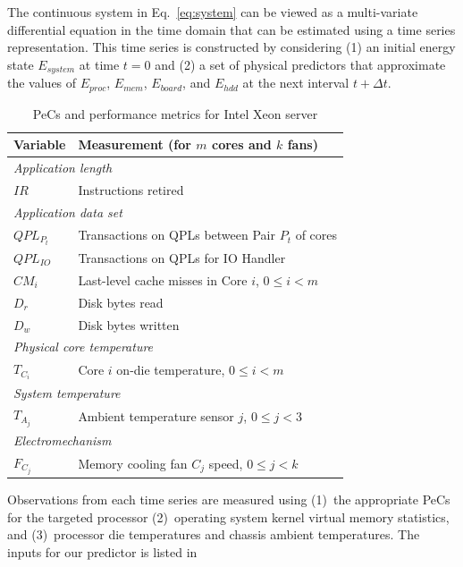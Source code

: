 \documentclass[times, 10pt,twocolumn]{IEEEtran}
\newcommand{\equationnames}{Eq.}
\begin{document}
The continuous system in \equationnames\ \eqref{eq:system} can be viewed
as a multi-variate differential equation in the time domain that can be
estimated using a time series representation. This time series is
constructed by considering (1) an initial energy state $E_{system}$ at
time $t=0$ and (2) a set of physical predictors that approximate the
values of $E_{proc}$, $E_{mem}$, $E_{board}$, and $E_{hdd}$ at the next
interval $t+\Delta t$.

\begin{small}
\begin{table}[!t]
  \centering
  \caption{PeCs and performance metrics for Intel Xeon server}
  \label{tab:intelmodel}
  \begin{tabular}{l l}
\hline
\hline
\textbf{Variable}&\textbf{Measurement} (for $m$ cores and $k$ fans)\\
\hline
\hline
\multicolumn{2}{l}{\textit{Application length}}\\
$IR$&Instructions retired \\
\hline
\multicolumn{2}{l}{\textit{Application data set}}\\
$QPL_{P_t}$&Transactions on QPLs between Pair $P_t$ of cores\\
$QPL_{IO}$&Transactions on QPLs for IO Handler\\
$CM_{i}$&Last-level cache misses in  Core $i$, $0\leq i < m$\\
$D_{r}$&Disk bytes read\\
$D_{w}$&Disk bytes written\\
\hline
\multicolumn{2}{l}{\textit{Physical core temperature}}\\
$T_{C_{i}}$&Core $i$ on-die temperature, $0\leq i < m$\\
\hline
\multicolumn{2}{l}{\textit{System temperature}}\\
$T_{A_{j}}$&Ambient temperature sensor $j$, $0\leq j < 3$\\
\hline
\multicolumn{2}{l}{\textit{Electromechanism}}\\
$F_{C_{j}}$&Memory cooling fan $C_j$ speed, $0\leq j < k$\\
\hline
  \end{tabular}
\end{table}
\end{small}
Observations from each time series are measured using (1)~the
appropriate PeCs for the targeted processor (2)~operating system kernel
virtual memory statistics, and (3)~processor die temperatures and
chassis ambient temperatures.  The inputs for our predictor is listed in
\end{document}
